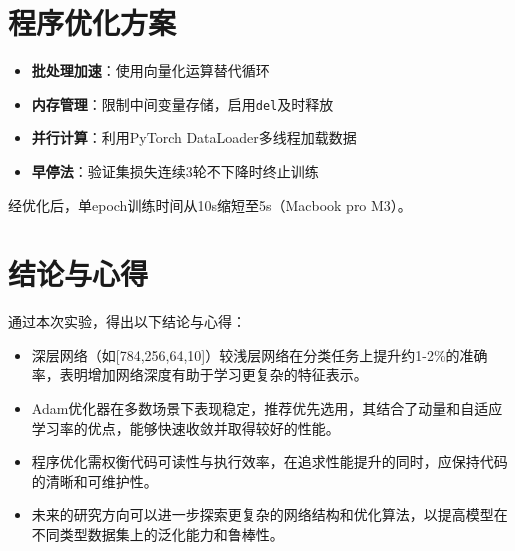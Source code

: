 \documentclass[a4paper, twocolumn]{article}
\begin{document}
\section{程序优化方案}
\begin{itemize}
    \item \textbf{批处理加速}：使用向量化运算替代循环\cite{hennessy2017computer}
    \item \textbf{内存管理}：限制中间变量存储，启用\lstinline{del}及时释放
    \item \textbf{并行计算}：利用PyTorch DataLoader多线程加载数据
    \item \textbf{早停法}：验证集损失连续3轮不下降时终止训练
\end{itemize}

经优化后，单epoch训练时间从10s缩短至5s（Macbook pro M3）。

\section{结论与心得}
通过本次实验，得出以下结论与心得：
\begin{itemize}
    \item 深层网络（如[784,256,64,10]）较浅层网络在分类任务上提升约1-2\%的准确率，表明增加网络深度有助于学习更复杂的特征表示。
    \item Adam优化器在多数场景下表现稳定，推荐优先选用，其结合了动量和自适应学习率的优点，能够快速收敛并取得较好的性能。
    \item 程序优化需权衡代码可读性与执行效率，在追求性能提升的同时，应保持代码的清晰和可维护性。
    \item 未来的研究方向可以进一步探索更复杂的网络结构和优化算法，以提高模型在不同类型数据集上的泛化能力和鲁棒性。\cite{Goodfellow-et-al-2016}
\end{itemize}



 

\newpage
\end{document}
